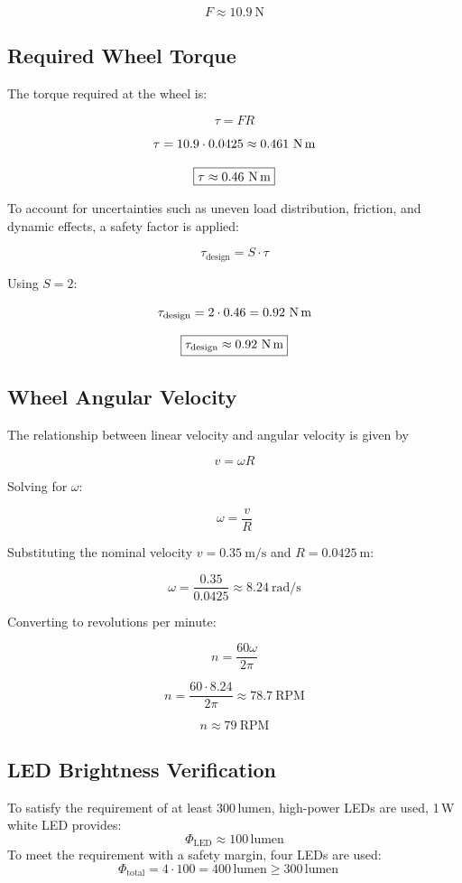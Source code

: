 \documentclass{article}
\begin{document}
\[
\boxed{F \approx 10.9\ \text{N}}
\]

\subsection{Required Wheel Torque}

The torque required at the wheel is:

\[
\tau = F R
\]

\[
\tau = 10.9 \cdot 0.0425 \approx 0.461\ \text{N\,m}
\]

\[
\boxed{\tau \approx 0.46\ \text{N\,m}}
\]

To account for uncertainties such as uneven load distribution, friction, and dynamic effects, a safety factor is applied:

\[
\tau_{\text{design}} = S \cdot \tau
\]

Using \(S=2\):

\[
\tau_{\text{design}} = 2 \cdot 0.46 = 0.92\ \text{N\,m}
\]

\[
\boxed{\tau_{\text{design}} \approx 0.92\ \text{N\,m}}
\]

\subsection{Wheel Angular Velocity}

The relationship between linear velocity and angular velocity is given by

\[
v = \omega R
\]

Solving for \(\omega\):

\[
\omega = \frac{v}{R}
\]

Substituting the nominal velocity \(v = 0.35\ \text{m/s}\) and \(R = 0.0425\ \text{m}\):

\[
\omega = \frac{0.35}{0.0425} \approx 8.24\ \text{rad/s}
\]

Converting to revolutions per minute:

\[
n = \frac{60\omega}{2\pi}
\]

\[
n = \frac{60 \cdot 8.24}{2\pi} \approx 78.7\ \text{RPM}
\]

\[
\boxed{n \approx 79\ \text{RPM}}
\]

\subsection{LED Brightness Verification}

To satisfy the requirement of at least \(300\,\text{lumen}\), high-power LEDs are used, 1\,W white LED provides:
\[
\Phi_{\text{LED}} \approx 100\,\text{lumen}
\]
To meet the requirement with a safety margin, four LEDs are used:
\[
\Phi_{\text{total}} = 4 \cdot 100 = 400\,\text{lumen} \geq 300\,\text{lumen} \quad
\]
\end{document}
